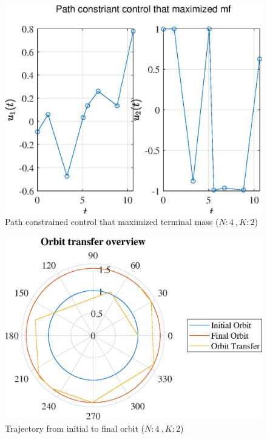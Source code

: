 \documentclass[]{article}
\begin{document}
	\begin{figure}
		\centering
		\includegraphics[scale=0.75]{path_N4_K2_C3_mf.eps}
		\caption{Path constrained control that maximized terminal mass (\(N:4\ , K:2\))}
		\label{fig:path_N4_K2_C3_mf}
	\end{figure}
	\begin{figure}
		\centering
		\includegraphics[scale=0.75]{orbit_N4_K2_C3_mf.eps}
		\caption{Trajectory from initial to final orbit (\(N:4\ , K:2\))}
		\label{fig:orbit_N4_K2_C3_mf}
	\end{figure}
\end{document}
